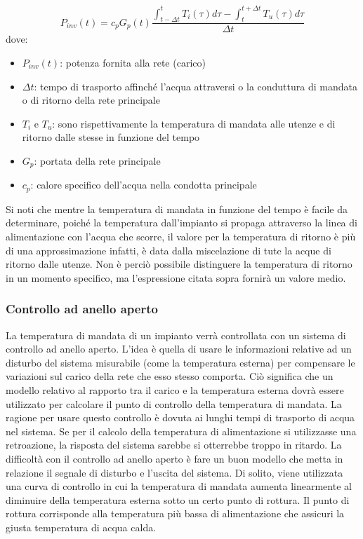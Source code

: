 \documentclass[laurea,oneside,11pt]{USiena_tesiLM}
\begin{document}
\begin{equation}
P_{inv}(t) = c_p G_p(t) \dfrac{\int_{t-\Delta t}^t T_i(\tau)d\tau - \int_{t}^{t + \Delta t } T_u(\tau)d\tau}{\Delta t}
\end{equation}
dove:
\begin{itemize}
\item[] $P_{inv}(t)$:  potenza fornita alla rete (carico)
\item[] $\Delta t$: tempo di trasporto affinché l'acqua attraversi o la conduttura di mandata o di ritorno della rete principale
\item[] $T_i$ e $T_u$: sono rispettivamente la temperatura di mandata alle utenze e di ritorno dalle stesse in funzione del tempo
\item[] $G_p$: portata della rete principale
\item[] $c_p$: calore specifico dell'acqua nella condotta principale
\end{itemize}

Si noti che mentre la temperatura di mandata in funzione del tempo è facile da determinare, poiché la temperatura dall'impianto si propaga attraverso la linea di alimentazione con l'acqua che scorre, il valore per la temperatura di ritorno è più di una approssimazione infatti, è data dalla miscelazione di tute la acque di ritorno dalle utenze. Non è perciò possibile distinguere la temperatura di ritorno in un momento specifico, ma l'espressione citata sopra fornirà un valore medio.

\subsubsection{Controllo ad anello aperto}
La temperatura di mandata di un impianto verrà controllata con un sistema di controllo ad anello aperto. L'idea è quella di usare le informazioni relative ad un disturbo del sistema misurabile (come la temperatura esterna) per compensare le variazioni sul carico della rete che esso stesso comporta. Ciò significa che un modello relativo al rapporto tra il carico e la temperatura esterna dovrà essere utilizzato per calcolare il punto di controllo della temperatura di mandata.
La ragione per usare questo controllo è dovuta ai lunghi tempi di trasporto di acqua nel sistema. Se per il calcolo della temperatura di alimentazione si utilizzasse una retroazione, la risposta del sistema sarebbe si otterrebbe troppo in ritardo.
La difficoltà con il controllo ad anello aperto è fare un buon modello che metta in relazione  il segnale di disturbo e l'uscita del sistema. Di solito, viene utilizzata una curva di controllo in cui la temperatura di mandata aumenta linearmente al diminuire della temperatura esterna sotto un certo punto di rottura. Il punto di rottura corrisponde alla temperatura più bassa di alimentazione che assicuri la giusta temperatura di acqua calda. 
\end{document}
